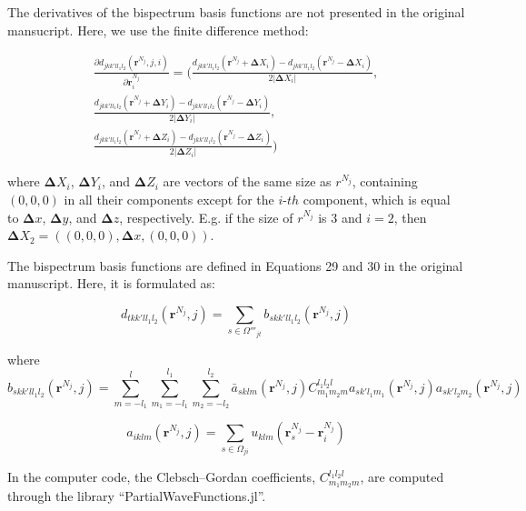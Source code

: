 \documentclass[12pt]{article}
\begin{document}
The derivatives of the bispectrum basis functions are not presented in the original mansucript. Here, we use the finite difference method:

\begin{equation}
\begin{split}
     \frac{\partial d_{jkk'l{l_1}{l_2}}(\bm r^{N_j}, j, i)}{\partial \bm r^{N_j}_i} =  
 \bigg( \frac{ d_{jkk'l{l_1}{l_2}}(\bm r^{N_j} + \bm \Delta X_i) - d_{jkk'l{l_1}{l_2}}(\bm r^{N_j} - \bm \Delta X_i) } {2 |\bm \Delta X_i|}, \\
          \frac{ d_{jkk'l{l_1}{l_2}}(\bm r^{N_j} + \bm \Delta Y_i) - d_{jkk'l{l_1}{l_2}}(\bm r^{N_j} - \bm \Delta Y_i) } {2 |\bm \Delta Y_i|},\\
          \frac{ d_{jkk'l{l_1}{l_2}}(\bm r^{N_j} + \bm \Delta Z_i) - d_{jkk'l{l_1}{l_2}}(\bm r^{N_j} - \bm \Delta Z_i) } {2 |\bm \Delta Z_i|} \bigg)
\end{split}
\end{equation}

where $\bm \Delta X_i$, $\bm \Delta Y_i$, and $\bm \Delta Z_i$ are vectors of the same size as $r^{N_j}$, containing $(0,0,0)$ in all their components except for the $i$-$th$ component, which is equal to $\bm \Delta x$, $\bm \Delta y$, and $\bm \Delta z$, respectively. E.g. if the size of $r^{N_j}$ is $3$ and $i = 2$, then $\bm \Delta X_2 = ( (0,0,0), \bm \Delta x, (0,0,0))$.

The bispectrum basis functions are defined in Equations 29 and 30 in the original manuscript. Here, it is formulated as:

\begin{equation}
    \label{eq:derd}
    d_{tkk'l{l_1}{l_2}}(\bm r^{N_j}, j) = \sum_{s \in \Omega'''_{jt}} b_{skk'l{l_1}{l_2}}(\bm r^{N_j}, j)
\end{equation}

where 
\begin{equation}
    b_{skk'l{l_1}{l_2}}(\bm r^{N_j}, j) = \sum_{m=-{l_1}}^l
     \sum_{m_1=-{l_1}}^{l_1}
     \sum_{m_2=-l_2}^{l_2}
     \bar{a}_{sklm}(\bm r^{N_j}, j)
     C_{{m_1}{m_2}m}^{{l_1}{l_2}l}
     a_{sk'{l_1}{m_1}}(\bm r^{N_j}, j)
     a_{sk'{l_2}{m_2}}(\bm r^{N_j}, j)
\end{equation}

\begin{equation}
    a_{iklm}(\bm r^{N_j}, j) = \sum_{s \in \Omega_{ji}} u_{klm}(\bm r^{N_j}_s -\bm r^{N_j}_i)
\end{equation}


In the computer code, the Clebsch–Gordan coefficients, $C_{{m_1}{m_2}m}^{{l_1}{l_2}l}$, are computed through the library ``PartialWaveFunctions.jl''.
\end{document}
